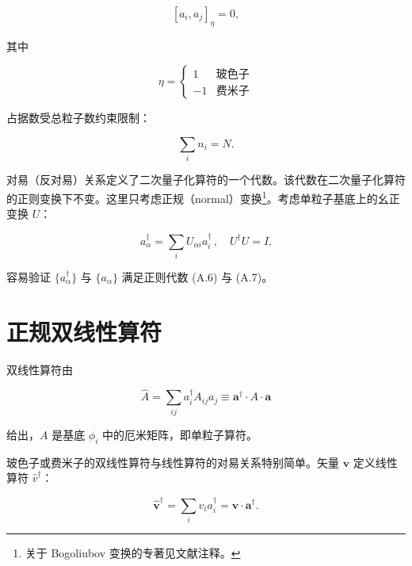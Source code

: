 \begin{equation*}
\left[ a _ {i}, a _ {j} \right]_{\eta} = 0 ,
\tag{A.7}
\end{equation*}

其中

\begin{equation*}
\eta = \left\{ \begin{array}{ll} 1 & \text{玻色子} \\ - 1 & \text{费米子} \end{array} \right.
\tag{A.8}
\end{equation*}

占据数受总粒子数约束限制：

\begin{equation*}
\sum_ {i} n _ {i} = N.
\tag{A.9}
\end{equation*}

对易（反对易）关系定义了二次量子化算符的一个代数。该代数在二次量子化算符的正则变换下不变。这里只考虑正规（normal）变换\footnote{关于 Bogoliubov 变换的专著见文献注释。}。考虑单粒子基底上的幺正变换 $U$：

\begin{equation*}
a _ {\alpha} ^ {\dagger} = \sum_ {i} U _ {\alpha i} a _ {i} ^ {\dagger} \, , \quad U ^ {\dagger} U = I.
\tag{A.10}
\end{equation*}

容易验证 $\{a_{\alpha}^{\dagger}\}$ 与 $\{a_{\alpha}\}$ 满足正则代数 (A.6) 与 (A.7)。

\section{正规双线性算符}

双线性算符由

\begin{equation*}
\hat {A} = \sum_ {ij} a _ {i} ^ {\dagger} A _ {ij} a _ {j} \equiv \mathbf {a} ^ {\dagger} \cdot A \cdot \mathbf {a}
\tag{A.11}
\end{equation*}

给出，$A$ 是基底 $\phi_{i}$ 中的厄米矩阵，即单粒子算符。

玻色子或费米子的双线性算符与线性算符的对易关系特别简单。矢量 $\mathbf{v}$ 定义线性算符 $\hat{v}^{\dagger}$：

\begin{equation*}
\hat {\mathbf {v}} ^ {\dagger} = \sum_ {i} v _ {i} a _ {i} ^ {\dagger} = \mathbf {v} \cdot \mathbf {a} ^ {\dagger}.
\tag{A.12}
\end{equation*}


